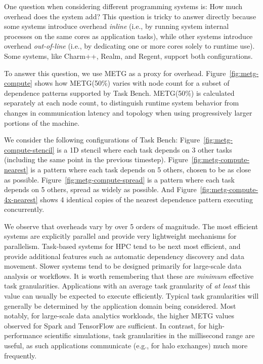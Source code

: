 One question when considering different programming
systems is: How much overhead does the system add? This question is tricky to answer directly because some systems introduce
overhead \emph{inline} (i.e., by running system internal processes on
the same cores as application tasks), while other systems introduce
overhead \emph{out-of-line} (i.e., by dedicating one or more cores
solely to runtime use). Some systems, like Charm++, Realm, and Regent,
support both configurations.

To answer this question, we use METG %
as a proxy for overhead. Figure~\ref{fig:metg-compute}
shows how METG(50\%) varies with node count for a subset of
dependence patterns supported by Task Bench. METG(50\%) is calculated
separately at each node count, to distinguish runtime system behavior from
changes in communication latency and topology when using
progressively larger portions of the machine.

We consider the following configurations of Task Bench:
Figure~\ref{fig:metg-compute-stencil} is a 1D stencil where each task
depends on 3 other tasks (including the same point in the previous
timestep). Figure~\ref{fig:metg-compute-nearest} is a pattern where
each task depends on 5 others, chosen to be as close as
possible. Figure~\ref{fig:metg-compute-spread} is a pattern where each
task depends on 5 others, spread as widely as possible. And
Figure~\ref{fig:metg-compute-4x-nearest} shows 4 identical copies of
the nearest dependence pattern executing concurrently.

We observe that overheads vary by over 5 orders of
magnitude. The most efficient systems are explicitly parallel
and provide very lightweight mechanisms for parallelism. Task-based systems for HPC tend to be next most efficient, and
provide additional features such as automatic dependency discovery and
data movement. Slower systems tend to be designed primarily for
large-scale data analysis or workflows. It is worth
remembering that these are \emph{minimum}
effective task granularities. Applications with an average
task granularity of \emph{at least} this value can usually be expected
to execute efficiently. Typical task granularities will
generally be determined by the application domain being
considered. Most notably, for large-scale data analytics workloads, the higher METG values observed for Spark and
TensorFlow are sufficient. In contrast, for high-performance
scientific simulations, task granularities in the millisecond range
are useful, as such applications communicate (e.g., for halo
exchanges) much more frequently.

